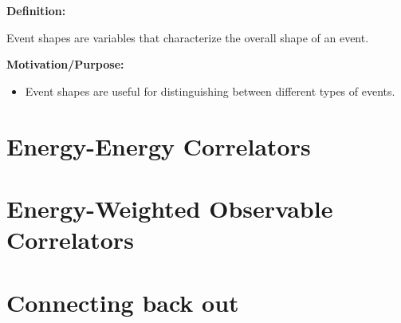 \begin{sambox}
    \textbf{Definition:}
    \begin{definition}
        \label{def:event_shapes}
        Event shapes are variables that characterize the overall shape of an event.
    \end{definition}

    \textbf{Motivation/Purpose:}
    \begin{itemize}
        \item Event shapes are useful for distinguishing between different types of events.
    \end{itemize}
\end{sambox}


\section{Energy-Energy Correlators}

\section{Energy-Weighted Observable Correlators}

\section{Connecting back out}
